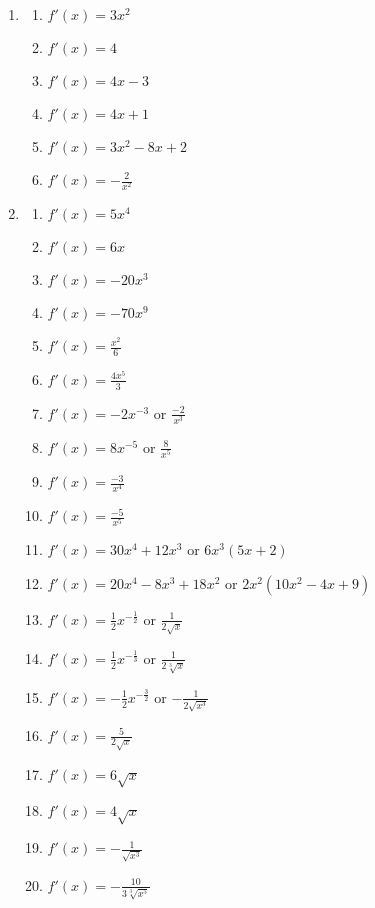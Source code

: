 \documentclass[a4paper,12pt]{article}
\begin{document}
\begin{enumerate}
\item
    \begin{multicols}{2}
    \begin{enumerate}
    \item $f'(x) = 3x^2$
    \item $f'(x) = 4$
    \item $f'(x) = 4x - 3$
    \item $f'(x) = 4x + 1$
    \item $f'(x) = 3x^2 - 8x + 2$
    \item $f'(x) = -\frac{2}{x^2}$
    \end{enumerate}
    \end{multicols}

\item
    \begin{multicols}{2}
    \begin{enumerate}
    \item $f'(x) = 5x^4$
    \item $f'(x) = 6x$
    \item $f'(x) = -20x^3$
    \item $f'(x) = -70x^9$
    \item $f'(x) = \frac{x^2}{6}$
    \item $f'(x) = \frac{4x^5}{3}$
    \item $f'(x) = -2x^{-3}$ or $\frac{-2}{x^3}$
    \item $f'(x) = 8x^{-5}$ or $\frac{8}{x^5}$
    \item $f'(x) = \frac{-3}{x^4}$
    \item $f'(x) = \frac{-5}{x^5}$
    \item $f'(x) = 30x^4 + 12x^3$ or $6x^3(5x + 2)$
    \item $f'(x) = 20x^4 - 8x^3 + 18x^2$ or $2x^2(10x^2 - 4x + 9)$
    \item $f'(x) = \frac{1}{2}x^{-\frac{1}{2}}$ or $\frac{1}{2\sqrt{x}}$
    \item $f'(x) = \frac{1}{2}x^{-\frac{1}{3}}$ or $\frac{1}{2\sqrt[3]{x}}$
    \item $f'(x) = -\frac{1}{2}x^{-\frac{3}{2}}$ or $-\frac{1}{2\sqrt{x^3}}$
    \item $f'(x) = \frac{5}{2\sqrt{x}}$
    \item $f'(x) = 6\sqrt{x}$
    \item $f'(x) = 4\sqrt{x}$
    \item $f'(x) = -\frac{1}{\sqrt{x^3}}$
    \item $f'(x) = -\frac{10}{3\sqrt[3]{x^5}}$
    \end{enumerate}
    \end{multicols}

\end{enumerate}
\end{document}
